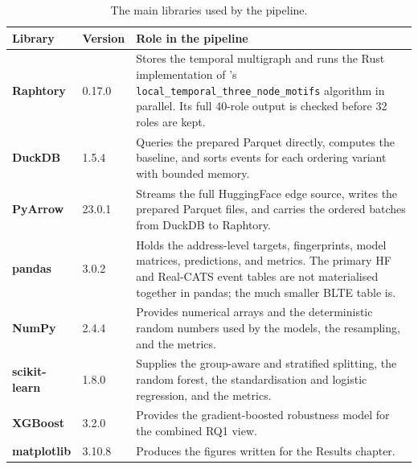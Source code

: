 \documentclass{thesisclass}
\begin{document}
\begin{table}[h]
\centering
\caption{The main libraries used by the pipeline.}
\label{tab:libraries}
\renewcommand{\arraystretch}{1.3}
\small
\begin{tabular}{p{2.7cm} p{1.5cm} p{8.5cm}}
\toprule
\textbf{Library} & \textbf{Version} & \textbf{Role in the pipeline} \\
\midrule

\textbf{Raphtory} &
  0.17.0 &
  Stores the temporal multigraph and runs the Rust implementation of
  \citet{paranjape2017motifs}'s \texttt{local\_temporal\_three\_node\_motifs}
  algorithm in parallel. Its full 40-role output is checked before 32 roles are
  kept. \\

\textbf{DuckDB} &
  1.5.4 &
  Queries the prepared Parquet directly, computes the baseline, and sorts events
  for each ordering variant with bounded memory. \\

\textbf{PyArrow} &
  23.0.1 &
  Streams the full HuggingFace edge source, writes the prepared Parquet files,
  and carries the ordered batches from DuckDB to Raphtory. \\

\textbf{pandas} &
  3.0.2 &
  Holds the address-level targets, fingerprints, model matrices, predictions, and
  metrics. The primary HF and Real-CATS event tables are not materialised
  together in pandas; the much smaller BLTE table is. \\

\textbf{NumPy} &
  2.4.4 &
  Provides numerical arrays and the deterministic random numbers used by the
  models, the resampling, and the metrics. \\

\textbf{scikit-learn} &
  1.8.0 &
  Supplies the group-aware and stratified splitting, the random forest, the
  standardisation and logistic regression, and the metrics. \\

\textbf{XGBoost} &
  3.2.0 &
  Provides the gradient-boosted robustness model for the combined RQ1 view. \\

\textbf{matplotlib} &
  3.10.8 &
  Produces the figures written for the Results chapter. \\

\bottomrule
\end{tabular}
\end{table}
\end{document}
